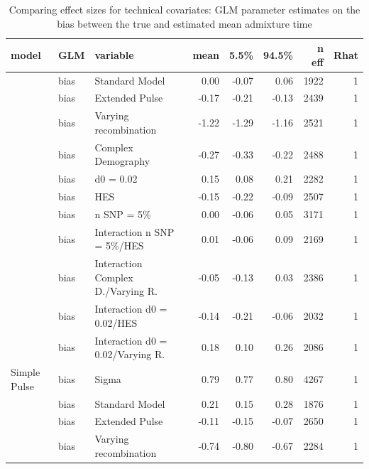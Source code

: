\documentclass[11pt]{article}
\begin{document}
\begin{table}[H]
\fontsize{8}{9}\selectfont
\caption{\label{tab:table_Supplements_ests_bias}Comparing effect sizes for technical covariates: GLM parameter estimates on the bias between the true and estimated mean admixture time}
\centering

\begin{tabular}[t]{l|l|l|r|r|r|r|r}
\hline
model & GLM & variable & mean & 5.5\% & 94.5\% & n eff & Rhat\\
\hline
 & bias & Standard Model & 0.00 & -0.07 & 0.06 & 1922 & 1\\

 & bias & Extended Pulse & -0.17 & -0.21 & -0.13 & 2439 & 1\\

 & bias & Varying recombination & -1.22 & -1.29 & -1.16 & 2521 & 1\\

 & bias & Complex Demography & -0.27 & -0.33 & -0.22 & 2488 & 1\\

 & bias & d0 = 0.02 & 0.15 & 0.08 & 0.21 & 2282 & 1\\

 & bias & HES & -0.15 & -0.22 & -0.09 & 2507 & 1\\

 & bias & n SNP = 5\% & 0.00 & -0.06 & 0.05 & 3171 & 1\\

 & bias & Interaction n SNP = 5\%/HES & 0.01 & -0.06 & 0.09 & 2169 & 1\\

 & bias & Interaction Complex D./Varying R. & -0.05 & -0.13 & 0.03 & 2386 & 1\\

 & bias & Interaction d0 = 0.02/HES & -0.14 & -0.21 & -0.06 & 2032 & 1\\

 & bias & Interaction d0 = 0.02/Varying R. & 0.18 & 0.10 & 0.26 & 2086 & 1\\

\multirow{-12}{*}{\raggedright\arraybackslash Simple Pulse} & bias & Sigma & 0.79 & 0.77 & 0.80 & 4267 & 1\\
\cline{1-8}
 & bias & Standard Model & 0.21 & 0.15 & 0.28 & 1876 & 1\\

 & bias & Extended Pulse & -0.11 & -0.15 & -0.07 & 2650 & 1\\

 & bias & Varying recombination & -0.74 & -0.80 & -0.67 & 2284 & 1\\


\end{tabular}
\end{table}
\end{document}
